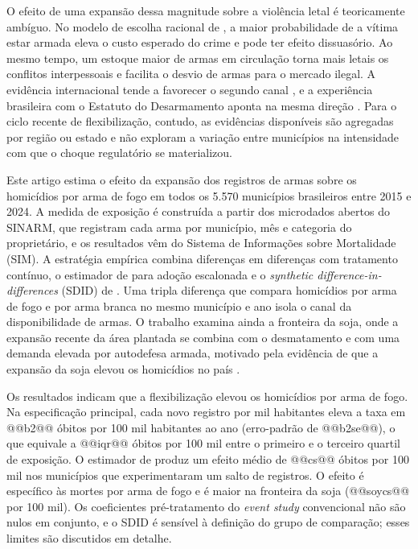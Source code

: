 \documentclass[11pt,a4paper]{article}
\begin{document}
O efeito de uma expansão dessa magnitude sobre a violência letal é teoricamente ambíguo. No modelo de escolha racional de \citet{becker1968}, a maior probabilidade de a vítima estar armada eleva o custo esperado do crime e pode ter efeito dissuasório. Ao mesmo tempo, um estoque maior de armas em circulação torna mais letais os conflitos interpessoais e facilita o desvio de armas para o mercado ilegal. A evidência internacional tende a favorecer o segundo canal \citep{duggan2001,cook2006}, e a experiência brasileira com o Estatuto do Desarmamento aponta na mesma direção \citep{souza2007,cerqueira2012}. Para o ciclo recente de flexibilização, contudo, as evidências disponíveis são agregadas por região ou estado \citep{baculi2021,wakim2025} e não exploram a variação entre municípios na intensidade com que o choque regulatório se materializou.

Este artigo estima o efeito da expansão dos registros de armas sobre os homicídios por arma de fogo em todos os 5.570 municípios brasileiros entre 2015 e 2024. A medida de exposição é construída a partir dos microdados abertos do SINARM, que registram cada arma por município, mês e categoria do proprietário, e os resultados vêm do Sistema de Informações sobre Mortalidade (SIM). A estratégia empírica combina diferenças em diferenças com tratamento contínuo, o estimador de \citet{callaway2021} para adoção escalonada e o \textit{synthetic difference-in-differences} (SDID) de \citet{arkhangelsky2021}. Uma tripla diferença que compara homicídios por arma de fogo e por arma branca no mesmo município e ano isola o canal da disponibilidade de armas. O trabalho examina ainda a fronteira da soja, onde a expansão recente da área plantada se combina com o desmatamento e com uma demanda elevada por autodefesa armada, motivado pela evidência de que a expansão da soja elevou os homicídios no país \citep{moreno2024}.

Os resultados indicam que a flexibilização elevou os homicídios por arma de fogo. Na especificação principal, cada novo registro por mil habitantes eleva a taxa em @@b2@@ óbitos por 100 mil habitantes ao ano (erro-padrão de @@b2se@@), o que equivale a @@iqr@@ óbitos por 100 mil entre o primeiro e o terceiro quartil de exposição. O estimador de \citet{callaway2021} produz um efeito médio de @@cs@@ óbitos por 100 mil nos municípios que experimentaram um salto de registros. O efeito é específico às mortes por arma de fogo e é maior na fronteira da soja (@@soycs@@ por 100 mil). Os coeficientes pré-tratamento do \textit{event study} convencional não são nulos em conjunto, e o SDID é sensível à definição do grupo de comparação; esses limites são discutidos em detalhe.
\end{document}
